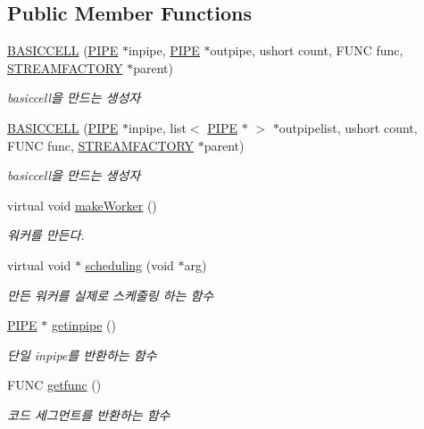 \subsection*{Public Member Functions}
\begin{DoxyCompactItemize}
\item 
\hyperlink{classBASICCELL_a0058bee3f5c99d05c321b47cb803badc}{B\+A\+S\+I\+C\+C\+E\+L\+L} (\hyperlink{classPIPE}{P\+I\+P\+E} $\ast$inpipe, \hyperlink{classPIPE}{P\+I\+P\+E} $\ast$outpipe, ushort count, F\+U\+N\+C func, \hyperlink{classSTREAMFACTORY}{S\+T\+R\+E\+A\+M\+F\+A\+C\+T\+O\+R\+Y} $\ast$parent)
\begin{DoxyCompactList}\small\item\em basiccell을 만드는 생성자 \end{DoxyCompactList}\item 
\hyperlink{classBASICCELL_a9e173d89e7c3c2b2513cb7f6d8f455b8}{B\+A\+S\+I\+C\+C\+E\+L\+L} (\hyperlink{classPIPE}{P\+I\+P\+E} $\ast$inpipe, list$<$ \hyperlink{classPIPE}{P\+I\+P\+E} $\ast$ $>$ $\ast$outpipelist, ushort count, F\+U\+N\+C func, \hyperlink{classSTREAMFACTORY}{S\+T\+R\+E\+A\+M\+F\+A\+C\+T\+O\+R\+Y} $\ast$parent)
\begin{DoxyCompactList}\small\item\em basiccell을 만드는 생성자 \end{DoxyCompactList}\item 
virtual void \hyperlink{classBASICCELL_aacb2fd7565d13f80e407854e0a978d73}{make\+Worker} ()
\begin{DoxyCompactList}\small\item\em 워커를 만든다. \end{DoxyCompactList}\item 
virtual void $\ast$ \hyperlink{classBASICCELL_a2e910313cdad1651908cca08f89be64c}{scheduling} (void $\ast$arg)
\begin{DoxyCompactList}\small\item\em 만든 워커를 실제로 스케줄링 하는 함수 \end{DoxyCompactList}\item 
\hyperlink{classPIPE}{P\+I\+P\+E} $\ast$ \hyperlink{classBASICCELL_a0008bc2d8bb7bd0f85729fd2f049458a}{getinpipe} ()
\begin{DoxyCompactList}\small\item\em 단일 inpipe를 반환하는 함수 \end{DoxyCompactList}\item 
F\+U\+N\+C \hyperlink{classBASICCELL_a0b157d23811cb140c2567572adc0034b}{getfunc} ()
\begin{DoxyCompactList}\small\item\em 코드 세그먼트를 반환하는 함수 \end{DoxyCompactList}\end{DoxyCompactItemize}
